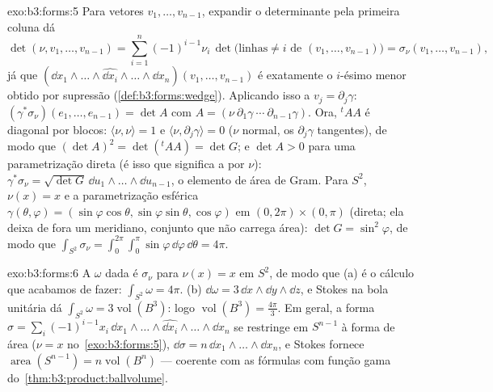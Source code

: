 \begin{solution}{exo:b3:forms:5}
Para vetores $v_1, \dots, v_{n-1}$, expandir o determinante
pela primeira coluna dá
\[
\det(\nu, v_1, \dots, v_{n-1}) =
\sum_{i=1}^n(-1)^{i-1}\nu_i\,
\det\bigl(\text{linhas} \neq i \text{ de } (v_1, \dots,
v_{n-1})\bigr)
= \sigma_\nu(v_1, \dots, v_{n-1}),
\]
já que $(\dd x_1\wedge\dots\wedge\widehat{\dd
x_i}\wedge\dots\wedge\dd x_n)(v_1, \dots, v_{n-1})$ é
exatamente o $i$-ésimo menor obtido por supressão
(\cref{def:b3:forms:wedge}). Aplicando isso a $v_j =
\partial_j\gamma$: $(\gamma^*\sigma_\nu)(e_1, \dots,
e_{n-1}) = \det A$ com $A = (\nu\ \partial_1\gamma\ \cdots\
\partial_{n-1}\gamma)$. Ora, ${}^t\!AA$ é diagonal por blocos:
$\langle\nu, \nu\rangle = 1$ e $\langle\nu,
\partial_j\gamma\rangle = 0$ ($\nu$ normal, os
$\partial_j\gamma$ tangentes), de modo que $(\det A)^2 =
\det({}^t\!AA) = \det G$; e $\det A > 0$ para uma parametrização
direta (é isso que significa a  por $\nu$):
$\gamma^*\sigma_\nu = \sqrt{\det G}\,\dd
u_1\wedge\dots\wedge\dd u_{n-1}$, o elemento de área de Gram. Para
$S^2$, $\nu(x) = x$ e a parametrização esférica
$\gamma(\theta, \varphi) = (\sin\varphi\cos\theta,
\sin\varphi\sin\theta, \cos\varphi)$ em
$(0,2\pi)\times(0,\pi)$ (direta; ela deixa de fora um meridiano, conjunto
que não carrega área): $\det G = \sin^2\varphi$, de modo que
$\int_{S^2}\sigma_\nu =
\int_0^{2\pi}\!\!\int_0^\pi\sin\varphi\,\dd\varphi\,
\dd\theta = 4\pi$.
\end{solution}

\begin{solution}{exo:b3:forms:6}
A $\omega$ dada é $\sigma_\nu$ para $\nu(x) = x$ em
$S^2$, de modo que (a) é o cálculo que acabamos de fazer:
$\int_{S^2}\omega = 4\pi$. (b) $\dd\omega = 3\,\dd
x\wedge\dd y\wedge\dd z$, e Stokes na bola unitária dá
$\int_{S^2}\omega = 3\operatorname{vol}(B^3)$: logo
$\operatorname{vol}(B^3) = \frac{4\pi}3$. Em geral, a
forma $\sigma = \sum_i(-1)^{i-1}x_i\,\dd
x_1\wedge\dots\wedge\widehat{\dd x_i}\wedge\dots\wedge\dd
x_n$ se restringe em $S^{n-1}$ à forma de área ($\nu = x$ no~\cref{exo:b3:forms:5}), $\dd\sigma = n\,\dd
x_1\wedge\dots\wedge\dd x_n$, e Stokes fornece
$\operatorname{area}(S^{n-1}) = n\operatorname{vol}(B^n)$
--- coerente com as fórmulas com função gama do~\cref{thm:b3:product:ballvolume}.
\end{solution}

